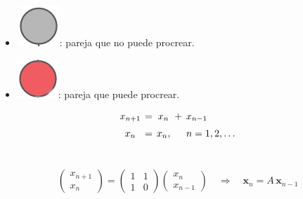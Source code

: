 {\begin{frame}
\begin{columns}[t]
\begin{column}{0.5\textwidth}
				\begin{itemize}
					\item[] \includegraphics[scale=0.25]{imagenes/off}: pareja que no puede procrear. \\[2mm]
					\item[] \includegraphics[scale=0.25]{imagenes/on}: pareja que puede procrear.
				\end{itemize}
				
				\vspace{0mm}
				\begin{alertblock}{}
					\[
					\begin{array}{c@{\hspace{0.7\tabcolsep}}c@{\hspace{0.7\tabcolsep}}c@{\hspace{0.7\tabcolsep}}c@{\hspace{0.7\tabcolsep}}l}
					x_{n+1}   & = & x_{n}  & + & x_{n-1} \\[2mm]
					x_{n} & = & x_{n},  &   & n=1,2,\hdots  \\[3mm]
					\end{array}
					\]
					
				\end{alertblock}
			\end{column}		
			
		\end{columns}
		
		\vspace{1mm}
		\[
		\left(
		\begin{array}{c}
		x_{n+1}   \\[1mm]
		x_{n} 
		\end{array}
		\right)
		=
		\left(
		\begin{array}{cc}
		1 & 1   \\[1mm]
		1 & 0
		\end{array}
		\right)
		\left(
		\begin{array}{c}
		x_{n}   \\[1mm]
		x_{n-1} 
		\end{array}
		\right)
		\quad \Longrightarrow \quad 
		\mathbf{x}_n = A\, \mathbf{x}_{n-1}
		\]
		

\end{frame}}
